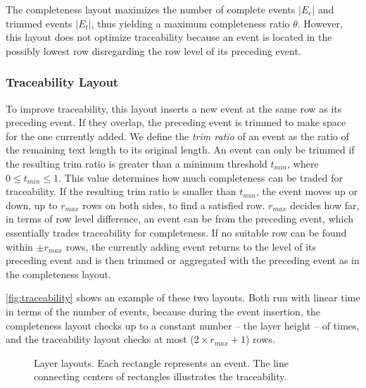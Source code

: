 The completeness layout maximizes the number of complete events $|E_c|$ and trimmed events $|E_t|$, thus yielding a maximum completeness ratio $\theta$. However, this layout does not optimize traceability because an event is located in the possibly lowest row disregarding the row level of its preceding event.

\subsubsection{Traceability Layout}
To improve traceability, this layout inserts a new event at the same row as its preceding event. If they overlap, the preceding event is trimmed to make space for the one currently added. We define the \emph{trim ratio} of an event as the ratio of the remaining text length to its original length. An event can only be trimmed if the resulting trim ratio is greater than a minimum threshold $t_{min}$, where $0\leq t_{min} \leq 1$. This value determines how much completeness can be traded for traceability. If the resulting trim ratio is smaller than $t_{min}$, the event moves up or down, up to $r_{max}$ rows on both sides, to find a satisfied row. $r_{max}$ decides how far, in terms of row level difference, an event can be from the preceding event, which essentially trades traceability for completeness. If no suitable row can be found within $\pm r_{max}$ rows, the currently adding event returns to the level of its preceding event and is then trimmed or aggregated with the preceding event as in the completeness layout.

\autoref{fig:traceability} shows an example of these two layouts. Both  run with linear time in terms of the number of events, because during the event insertion, the completeness layout checks up to a constant number -- the layer height -- of times, and the traceability layout checks at most ($2 \times r_{max}+1$) rows.

\begin{figure}
\centering
	\hfill
\caption[Layer layouts]{Layer layouts. Each rectangle represents an event. The line connecting centers of rectangles illustrates the  traceability.}
\label{fig:traceability}
\end{figure}

